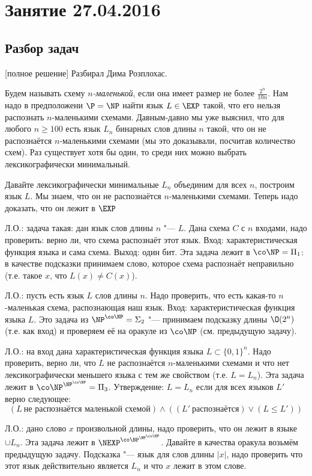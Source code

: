\chapter{Занятие 27.04.2016}

\section{Разбор задач}
[полное решение]
	Разбирал Дима Розплохас.

	Будем называть схему \textit{$n$-маленькой}, если она имеет размер не более $\frac{2^n}{10n}$.
	Нам надо в предположени $\P=\NP$ найти язык $L \in \EXP$ такой, что его нельзя распознать $n$-маленькими схемами.
	Давным-давно мы уже выяснил, что для любого $n\ge100$ есть язык $L_n$ бинарных слов длины $n$ такой,
	что он не распознаётся $n$-маленькими схемами (мы это доказывали, посчитав количество схем).
	Раз существует хотя бы один, то среди них можно выбрать лексикографически минимальный.

	Давайте лексикографически минимальные $L_n$ объединим для всех $n$, построим язык $L$.
	Мы знаем, что он не распознаётся $n$-маленькими схемами.
	Теперь надо доказать, что он лежит в $\EXP$

	Л.О.: задача такая: дан язык слов длины $n$ "--- $L$.
	Дана схема $C$ с $n$ входами, надо проверить: верно ли, что схема распознаёт этот язык.
	Вход: характеристическая функция языка и сама схема.
	Выход: один бит.
	Эта задача лежит в $\co\NP=\Pi_1$: в качестве подсказки принимаем слово, которое схема распознаёт неправильно
	(т.е. такое $x$, что $L(x) \neq C(x)$).

	Л.О.: пусть есть язык $L$ слов длины $n$.
	Надо проверить, что есть какая-то $n$-маленькая схема, распознающая наш язык.
	Вход: характеристическая функция языка $L$.
	Это задача из $\NP^{\co\NP}=\Sigma_2$ "--- принимаем подсказку длины $\O(2^n)$ (т.е. как вход) и проверяем
	её на оракуле из $\co\NP$ (см. предыдущую задачу).

	Л.О.: на вход дана характеристическая функция языка $L \subset \{0, 1\}^n$.
	Надо проверить, верно ли, что $L$ не распознаётся $n$-маленькими схемами и что нет лексикографически меньшего языка с тем же свойством (т.е. $L=L_n$).
	Эта задача лежит в $\co\NP^{\NP^{\co\NP}}=\Pi_3$.
	Утверждение: $L=L_n$ если для всех языков $L'$ верно следующее:
	\[
		(L~\text{не распознаётся маленькой схемой}) \land ((L'~\text{распознаётся}) \lor (L\leq L'))
	\]

	Л.О.: дано слово $x$ произвольной длины, надо проверить, что он лежит в языке $\cup L_n$.
	Эта задача лежит в $\NEXP^{\co\NP^{\NP^{\co\NP}}}$.
	Давайте в качества оракула возьмём предыдущую задачу.
	Подсказка "--- язык для слов длины $|x|$, надо проверить что этот язык действительно является $L_n$
	и что $x$ лежит в этом слове.

